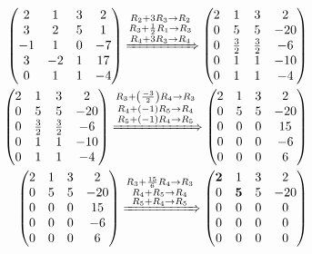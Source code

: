 \documentclass[conference,final,11pt,technote,onecolumn]{IEEEtran}\usepackage[]{graphicx}\usepackage[]{color}
\begin{document}
\begin{eqnarray}
\nonumber \begin{pmatrix}
2 & 1 & 3 & 2\\
3 & 2 & 5 & 1\\
-1 & 1 & 0 & -7\\
3 & -2 & 1 & 17\\
0 & 1 & 1 & -4
\end{pmatrix} \xRightarrow{\substack{R_2+3R_3\rightarrow R_2\\R_3+\frac{1}{2}R_1\rightarrow R_3\\ R_4+3R_3\rightarrow R_4}} \begin{pmatrix}
2 & 1 & 3 & 2\\
0 & 5 & 5 & -20\\
0 & \frac{3}{2} & \frac{3}{2} & -6\\
0 & 1 & 1 & -10\\
0 & 1 & 1 & -4
\end{pmatrix}\\
\nonumber \begin{pmatrix}
2 & 1 & 3 & 2\\
0 & 5 & 5 & -20\\
0 & \frac{3}{2} & \frac{3}{2} & -6\\
0 & 1 & 1 & -10\\
0 & 1 & 1 & -4
\end{pmatrix} \xRightarrow{\substack{R_3+\left(\frac{-3}{2}\right)R_4\rightarrow R_3\\R_4+(-1)R_5\rightarrow R_4\\R_5+(-1)R_4\rightarrow R_5}}  \begin{pmatrix}
2 & 1 & 3 & 2\\
0 & 5 & 5 & -20\\
0 & 0 & 0 & 15\\
0 & 0 & 0 & -6\\
0 & 0 & 0 & 6
\end{pmatrix}\\
\nonumber \begin{pmatrix}
2 & 1 & 3 & 2\\
0 & 5 & 5 & -20\\
0 & 0 & 0 & 15\\
0 & 0 & 0 & -6\\
0 & 0 & 0 & 6
\end{pmatrix} \xRightarrow{\substack{R_3+\frac{15}{6}R_4\rightarrow R_3\\R_4+R_5\rightarrow R_4\\R_5+R_4\rightarrow R_5}} \begin{pmatrix}
\mathbf{2} & 1 & 3 & 2\\
0 & \mathbf{5} & 5 & -20\\
0 & 0 & 0 & 0\\
0 & 0 & 0 & 0\\
0 & 0 & 0 & 0
\end{pmatrix}
\end{eqnarray}
\end{document}
